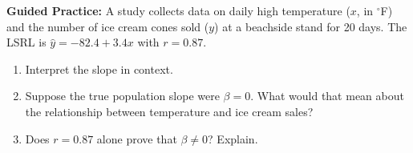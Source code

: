 \documentclass[10pt]{article}
\begin{document}
\begin{practicebox}
\textbf{Guided Practice:} A study collects data on daily high temperature ($x$, in $^\circ$F)
and the number of ice cream cones sold ($y$) at a beachside stand for 20 days. The LSRL is
$\hat{y} = -82.4 + 3.4x$ with $r = 0.87$.

\begin{enumerate}
  \item Interpret the slope in context.

  \item Suppose the true population slope were $\beta = 0$. What would that mean
        about the relationship between temperature and ice cream sales?

  \item Does $r = 0.87$ alone prove that $\beta \ne 0$? Explain.
\end{enumerate}
\end{practicebox}
\end{document}
